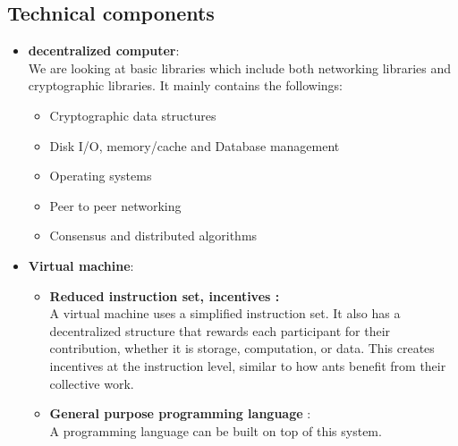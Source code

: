 \subsection*{Technical components}
\begin{itemize}
    \item \textbf{decentralized computer}:\\
    We are looking at basic libraries which include both networking libraries and cryptographic libraries. It mainly contains the followings:
    \begin{itemize}
        \item Cryptographic data structures
        \item Disk I/O, memory/cache and Database management
        \item Operating systems 
        \item Peer to peer networking
        \item Consensus and distributed algorithms
    \end{itemize}
    \item \textbf{Virtual machine}:
    \begin{itemize}
        \item \textbf{Reduced instruction set, incentives :} \\
        A virtual machine uses a simplified instruction set. It also has a decentralized structure that rewards each participant for their contribution, whether it is storage, computation, or data. This creates incentives at the instruction level, similar to how ants benefit from their collective work.
        \item \textbf{General purpose programming language} : \\
        A programming language can be built on top of this system.
    \end{itemize}
\end{itemize}
